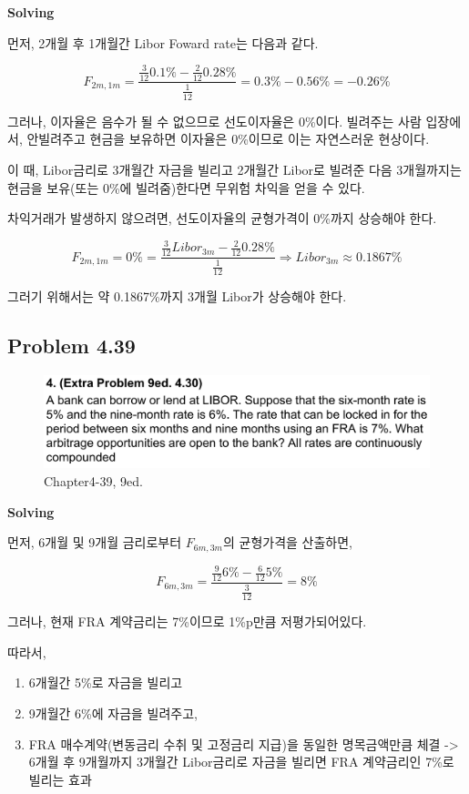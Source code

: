 \documentclass[
  letterpaper,
  DIV=11,
  numbers=noendperiod]{scrreprt}
\providecommand{\tightlist}{%
  \setlength{\itemsep}{0pt}\setlength{\parskip}{0pt}}\usepackage{longtable,booktabs,array}
\begin{document}
\textbf{Solving}

먼저, 2개월 후 1개월간 Libor Foward rate는 다음과 같다.

\[F_{2m,1m}=\frac{\frac{3}{12}0.1\%-\frac{2}{12}0.28\%}{\frac{1}{12}}=0.3\%-0.56\%=-0.26\%\]

그러나, 이자율은 음수가 될 수 없으므로 선도이자율은 0\%이다. 빌려주는
사람 입장에서, 안빌려주고 현금을 보유하면 이자율은 0\%이므로 이는
자연스러운 현상이다.

이 때, Libor금리로 3개월간 자금을 빌리고 2개월간 Libor로 빌려준 다음
3개월까지는 현금을 보유(또는 0\%에 빌려줌)한다면 무위험 차익을 얻을 수
있다.

차익거래가 발생하지 않으려면, 선도이자율의 균형가격이 0\%까지 상승해야
한다.

\[F_{2m,1m}=0\%=\frac{\frac{3}{12}Libor_{3m}-\frac{2}{12}0.28\%}{\frac{1}{12}}\Rightarrow Libor_{3m}\approx 0.1867\%\]

그러기 위해서는 약 0.1867\%까지 3개월 Libor가 상승해야 한다.

\subsection*{\texorpdfstring{\textbf{Problem
4.39}}{Problem 4.39}}\label{problem-4.39}

\begin{figure}[H]

{\centering \includegraphics{images/선물옵션_4-30.png}

}

\caption{Chapter4-39, 9ed.}

\end{figure}%

\textbf{Solving}

먼저, 6개월 및 9개월 금리로부터 \(F_{6m,3m}\)의 균형가격을 산출하면,

\[F_{6m,3m}=\frac{\frac{9}{12}6\%-\frac{6}{12}5\%}{\frac{3}{12}}=8\%\]

그러나, 현재 FRA 계약금리는 7\%이므로 1\%p만큼 저평가되어있다.

따라서,

\begin{enumerate}
\def\labelenumi{\arabic{enumi}.}
\tightlist
\item
  6개월간 5\%로 자금을 빌리고
\item
  9개월간 6\%에 자금을 빌려주고,
\item
  FRA 매수계약(변동금리 수취 및 고정금리 지급)을 동일한 명목금액만큼
  체결 -\textgreater{} 6개월 후 9개월까지 3개월간 Libor금리로 자금을
  빌리면 FRA 계약금리인 7\%로 빌리는 효과
\end{enumerate}
\end{document}
